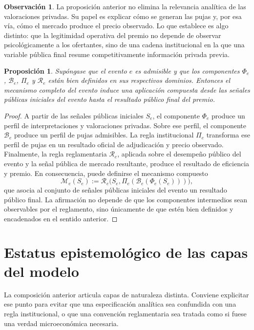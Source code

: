 \documentclass[11pt,a4paper]{article}
\newtheorem{proposicion}{Proposición}
\theoremstyle{definition}
\newtheorem{observacion}{Observación}
\begin{document}
\begin{observacion}
La proposición anterior no elimina la relevancia analítica de las valoraciones privadas. Su papel es explicar cómo se generan las pujas y, por esa vía, cómo el mercado produce el precio observado. Lo que establece es algo distinto: que la legitimidad operativa del premio no depende de observar psicológicamente a los ofertantes, sino de una cadena institucional en la que una variable pública final resume competitivamente información privada previa.
\end{observacion}
\begin{proposicion}\label{prop:composicion-mecanismo}
Supóngase que el evento $e$ es admisible y que los componentes $\Phi_e$, $\mathcal B_e$, $\Pi_e$ y $\mathcal R_e$ están bien definidos en sus respectivos dominios. Entonces el mecanismo completo del evento induce una aplicación compuesta desde las señales públicas iniciales del evento hasta el resultado público final del premio.
\end{proposicion}

\begin{proof}
A partir de las señales públicas iniciales $S_e$, el componente $\Phi_e$ produce un perfil de interpretaciones y valoraciones privadas. Sobre ese perfil, el componente $\mathcal B_e$ produce un perfil de pujas admisibles. La regla institucional $\Pi_e$ transforma ese perfil de pujas en un resultado oficial de adjudicación y precio observado. Finalmente, la regla reglamentaria $\mathcal R_e$, aplicada sobre el desempeño público del evento y la señal pública de mercado resultante, produce el resultado de eficiencia y premio. En consecuencia, puede definirse el mecanismo compuesto
\[
\mathcal M_e(S_e):=\mathcal R_e\big(S_e,\Pi_e(\mathcal B_e(\Phi_e(S_e)))\big),
\]
que asocia al conjunto de señales públicas iniciales del evento un resultado público final. La afirmación no depende de que los componentes intermedios sean observables por el reglamento, sino únicamente de que estén bien definidos y encadenados en el sentido anterior.
\end{proof}

\section{Estatus epistemológico de las capas del modelo}

La composición anterior articula capas de naturaleza distinta. Conviene explicitar ese punto para evitar que una especificación analítica sea confundida con una regla institucional, o que una convención reglamentaria sea tratada como si fuese una verdad microeconómica necesaria.
\end{document}

